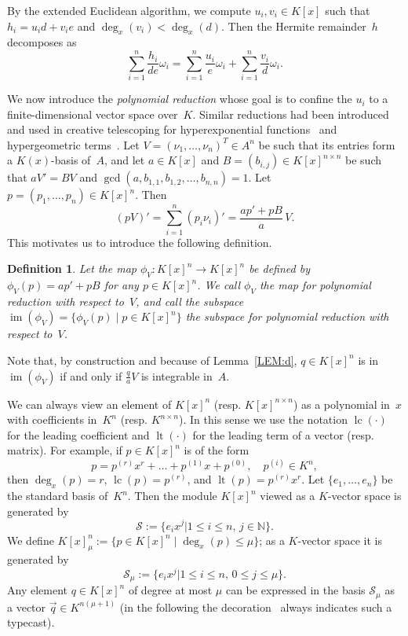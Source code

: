 \documentclass{sig-alternate}
\newtheorem{defi}[theorem]{Definition}
\newcommand{\bN}{ {\mathbb N}}
\newcommand{\cS}{ {\mathcal S}}
\def\lc{\operatorname{lc}}
\def\lt{\operatorname{lt}}
\def\im{\operatorname{im}}
\begin{document}
By the extended Euclidean algorithm, we compute $u_i, v_i\in K[x]$ such that
$h_i = u_i d + v_i e$ and $\deg_x(v_i) < \deg_x(d)$. Then the Hermite remainder~$h$
decomposes as
\begin{equation}\label{EQ:h}
  \sum_{i=1}^n \frac{h_i}{de}\omega_i =  \sum_{i=1}^n \frac{u_i}{e}\omega_i + \sum_{i=1}^n \frac{v_i}{d}\omega_i.
\end{equation}

We now introduce the \emph{polynomial reduction} whose goal is to confine the $u_i$ to a finite-dimensional
vector space over~$K$. Similar reductions had been introduced and used in creative telescoping
for hyperexponential functions~\cite{bostan13a} and hypergeometric terms~\cite{chen15a}.
Let $V = (\nu_1, \ldots, \nu_n)^T\in A^n$ be such that its entries form a $K(x)$-basis of~$A$,
and let $a\in K[x]$ and $B = (b_{i, j})\in K[x]^{n \times n}$ be such that $aV'=BV$ and
$\gcd(a, b_{1, 1}, b_{1, 2}, \ldots, b_{n ,n})=1$. Let $p = (p_1, \ldots, p_n)\in K[x]^n$. Then
\begin{equation} \label{EQ:polyred}
  (pV)' = \sum_{i=1}^n (p_i \nu_i)' = \frac{ap' + pB}{a}\, V.
\end{equation}
This motivates us to introduce the following definition.
\begin{defi}
Let the map $\phi_V\colon K[x]^n \rightarrow K[x]^n$
be defined by $\phi_V(p) = ap' + pB$ for any $p\in K[x]^n$.
We call $\phi_V$ the \emph{map for polynomial reduction} with respect to~$V$, and call
the subspace $\im(\phi_V) = \{\phi_V(p) \mid p \in K[x]^n\}$
the \emph{subspace for polynomial reduction} with respect to~$V$.
\end{defi}

Note that, by construction and because of Lemma~\ref{LEM:d}, $q\in K[x]^n$ is in
$\im(\phi_V)$ if and only if $\frac{q}{a}V$ is integrable in~$A$.

We can always view an element of $K[x]^n$ (resp. $K[x]^{n\times n}$) as a polynomial in~$x$
with coefficients in~$K^n$ (resp. $K^{n\times n}$). In this sense we use the notation $\lc(\cdot)$
for the leading coefficient and $\lt(\cdot)$ for the leading term of a vector (resp. matrix).
For example, if $p\in K[x]^n$ is of the form
\[
  p = p^{(r)}x^r + \dots + p^{(1)}x + p^{(0)},\quad p^{(i)}\in K^n,
\]
then $\deg_x(p)=r$, $\lc(p)=p^{(r)}$, and $\lt(p)=p^{(r)}x^r$.
Let $\{e_1, \ldots, e_n\}$ be the standard basis of~$K^n$.
Then the module $K[x]^n$ viewed as a $K$-vector space is generated by
\[
  \cS := \bigl\{e_ix^j \mathrel{\big|} 1\leq i \leq n,\, j\in \bN\bigr\}.
\]
We define $K[x]_\mu^n:=\{p\in K[x]^n \mid \deg_x(p) \leq \mu\}$; as a $K$-vector
space it is generated by
\[
  \cS_\mu := \bigl\{e_ix^j \mathrel{\big|} 1\leq i \leq n,\, 0\leq j\leq \mu\bigr\}.
\]
Any element $q\in K[x]^n$ of degree at most $\mu$ can be expressed in the
basis $\cS_\mu$ as a vector $\vec{q}\in K^{n(\mu+1)}$ (in the following the
decoration~\raisebox{-1pt}{$\vec{}\;$} always indicates such a typecast).
\end{document}
